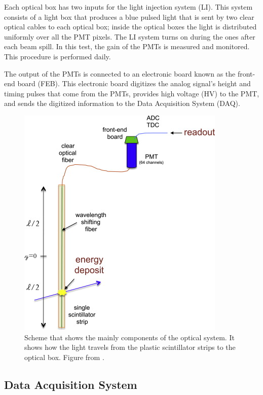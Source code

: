 Each optical box has two inputs for the light injection system (LI). This system consists of a light box that produces a blue pulsed light that is sent by two clear optical cables to each optical box; inside the optical boxes the light is distributed uniformly over all the PMT pixels. The LI system turns on during the ones after each beam spill. In this test, the gain of the PMTs is measured and monitored. This procedure is performed daily. 

The output of the PMTs is connected to an electronic board known as the front-end board (FEB). This electronic board digitizes the analog signal's height and timing pulses that come from the PMTs, provides high voltage (HV) to the PMT, and sends the digitized information to the Data Acquisition System (DAQ). 

\begin{figure}
    \centering
    \includegraphics{Figures/Chapter2/OpticalSystem.jpg}
    \caption{Scheme that shows the mainly components of the optical system. It shows how the light travels from the plastic scintillator strips to the optical box. Figure from \cite{MINERvA}.}
    \label{fig:MnvExp:MnvDetector:OpticalSystem}
\end{figure}

\subsection{Data Acquisition System }
\label{Cap:MnvExp:MnvDetector:DAQ}

